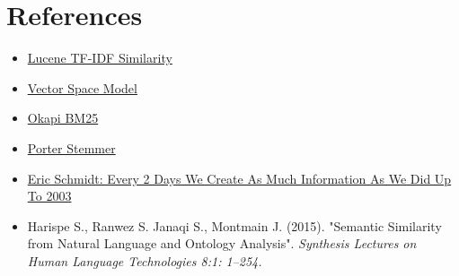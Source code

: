 \documentclass[parskip=full]{aaltoseries}
\begin{document}
 
\chapter{References}
\begin{itemize}
\item \href{https://lucene.apache.org/core/6_0_0/core/org/apache/lucene/search/similarities/TFIDFSimilarity.html}{Lucene TF-IDF Similarity}
\item \href{https://en.wikipedia.org/wiki/Vector_space_model}{Vector Space Model}
\item \href{https://en.wikipedia.org/wiki/Okapi_BM25}{Okapi BM25}
\item \href{http://snowball.tartarus.org/algorithms/porter/stemmer.html}{Porter Stemmer}
\item \href{http://techcrunch.com/2010/08/04/schmidt-data/}{Eric Schmidt: Every 2 Days We Create As Much Information As We Did Up To 2003}
\item Harispe S., Ranwez S. Janaqi S., Montmain J. (2015). "Semantic Similarity from Natural Language and Ontology Analysis". \textit{Synthesis Lectures on Human Language Technologies 8:1: 1–254.}
\end{itemize}
\end{document}
